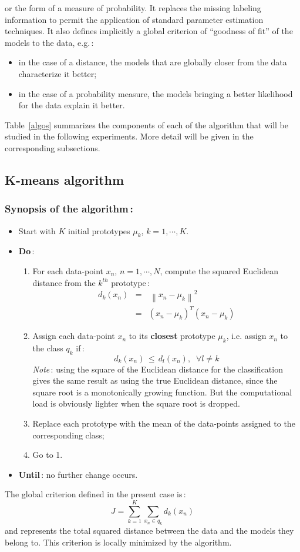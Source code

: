 \documentclass[twoside,a4paper,titlepage]{article}
\begin{document}
or the form of a measure of probability. It replaces the missing labeling
information to permit the application of standard parameter estimation
techniques.  It also defines implicitly a global criterion of ``goodness
of fit'' of the models to the data, e.g.\,:
\begin{itemize}
\item in the case of a distance, the models that are globally closer from
the data characterize it better;
\item in the case of a probability measure, the models bringing a better
likelihood for the data explain it better.
\end{itemize}
Table~\ref{algos} summarizes the components of each of the algorithm that
will be studied in the following experiments. More detail will be given in
the corresponding subsections.

\pagebreak
\subsection{K-means algorithm}
\subsubsection*{Synopsis of the algorithm\,:}
\begin{itemize}
\item Start with $K$ initial prototypes $\mu_k$, $k=1,\cdots,K$.
\item {\bf Do}\,:
\begin{enumerate}
\item For each data-point $x_n$, $n=1,\cdots,N$, compute the squared Euclidean
distance from the $k^{th}$ prototype\,:
\begin{eqnarray}
\label{eq:dist}
d_k(x_n) & = & \, \left\| x_n - \mu_k \right\|^2 \nonumber \\
         & = & (x_n-\mu_k)^T(x_n-\mu_k)   \nonumber
\end{eqnarray}
\item Assign each data-point $x_n$ to its {\bf closest} prototype $\mu_k$,
i.e. assign $x_n$ to the class $q_k$ if\,:
\[
d_k(x_n) \, \leq \, d_l(x_n),
\;\; \forall l \neq k
\]
{\em Note}\,: using the square of the Euclidean distance for the
classification gives the same result as using the true Euclidean distance,
since the square root is a monotonically growing function. But the
computational load is obviously lighter when the square root is dropped.
\item Replace each prototype with the mean of the data-points assigned to
the corresponding class;
\item Go to 1.
\end{enumerate}
\item {\bf Until}\,: no further change occurs.
\end{itemize}
The global criterion defined in the present case is\,:
\[
	J = \sum_{k=1}^{K} \sum_{x_n \in q_k} d_k(x_n)
\]
and represents the total squared distance between the data and the models
they belong to. This criterion is locally minimized by the algorithm.
\end{document}
